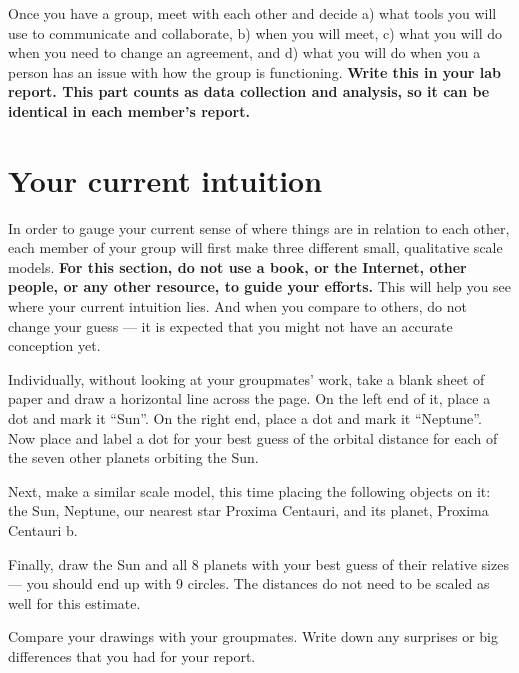 \begin{steps}
	\item Once you have a group, meet with each other and decide a) what tools you will use to communicate and collaborate, b) when you will meet, c) what you will do when you need to change an agreement, and d) what you will do when you a person has an issue with how the group is functioning. \textbf{Write this in your lab report. This part counts as data collection and analysis, so it can be identical in each member's report.}
\end{steps}

\section{Your current intuition}\label{se:sec:intuition}

In order to gauge your current sense of where things are in relation to each other, each member of your group will first make three different small, qualitative scale models. \textbf{For this section, do not use a book, or the Internet, other people, or any other resource, to guide your efforts.} This will help you see where your current intuition lies. And when you compare to others, do not change your guess --- it is expected that you might not have an accurate conception yet.

\begin{steps}
	\item Individually, without looking at your groupmates' work, take a blank sheet of paper and draw a horizontal line across the page. On the left end of it, place a dot and mark it ``Sun''. On the right end, place a dot and mark it ``Neptune''. Now place and label a dot for your best guess of the orbital distance for each of the seven other planets orbiting the Sun.

	\item Next, make a similar scale model, this time placing the following objects on it: the Sun, Neptune, our nearest star Proxima Centauri, and its planet, Proxima Centauri b.
	
	\item Finally, draw the Sun and all 8 planets with your best guess of their relative sizes --- you should end up with 9 circles. The distances do not need to be scaled as well for this estimate.

	\item Compare your drawings with your groupmates. Write down any surprises or big differences that you had for your report.
\end{steps}

